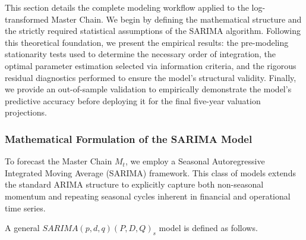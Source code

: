 This section details the complete modeling workflow applied to the log-transformed Master Chain. We begin by defining the mathematical structure and the strictly required statistical assumptions of the SARIMA algorithm. Following this theoretical foundation, we present the empirical results: the pre-modeling stationarity tests used to determine the necessary order of integration, the optimal parameter estimation selected via information criteria, and the rigorous residual diagnostics performed to ensure the model's structural validity. Finally, we provide an out-of-sample validation to empirically demonstrate the model's predictive accuracy before deploying it for the final five-year valuation projections.
\subsubsection{Mathematical Formulation of the SARIMA Model}
To forecast the Master Chain $M_t$, we employ a Seasonal Autoregressive Integrated Moving Average (SARIMA) framework. This class of models extends the standard ARIMA structure to explicitly capture both non-seasonal momentum and repeating seasonal cycles inherent in financial and operational time series.


A general $SARIMA(p,d,q)(P,D,Q)_s$ model is defined as follows.


